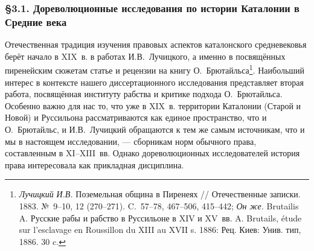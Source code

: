 \subsubsection*{§3.1. Дореволюционные исследования по истории Каталонии в Средние века}

Отечественная традиция изучения правовых аспектов каталонского средневековья берёт начало в XIX~в. в работах И.В.~Лучицкого, а именно в посвящённых пиренейским сюжетам статье и рецензии на книгу О.~Брютайльса\footnote{\emph{Лучицкий}\emph{ И.В.} Поземельная община в Пиренеях // Отечественные записки. 1883. №~9--10, 12 (270--271). C.~57--78, 467--506, 415--442; \emph{Он же.} Brutailis A. Русские рабы и рабство в Руссильоне в XIV и XV~вв. A. Brutails, étude sur l’esclavage en Roussillon du XIII au XVII s. 1886: Рец. Киев: Унив. тип, 1886. 30 c.}. Наибольший интерес в контексте нашего диссертационного исследования представляет вторая работа, посвящённая институту рабства и критике подхода О.~Брютайльса. Особенно важно для нас то, что уже в XIX~в. территории Каталонии (Старой и Новой) и Руссильона рассматриваются как единое пространство, что и О.~Брютайльс, и И.В.~Лучицкий обращаются к тем же самым источникам, что и мы в настоящем исследовании, --- сборникам норм обычного права, составленным в XI--XIII~вв. Однако дореволюционных исследователей история права интересовала как прикладная дисциплина.

